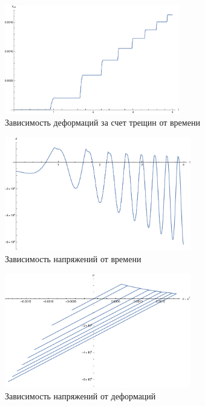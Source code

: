 \documentclass[12pt,a4paper]{article}
\begin{document}
\begin{enumerate}
    \begin{figure}[h]
      \centering
      \includegraphics[width=0.68\textwidth]{T2/h_1_tau_0.005/epsilon_crk(t).pdf}
      \caption{Зависимость деформаций за счет трещин от времени}
    \end{figure}

    \pagebreak

    \begin{figure}[h]
      \centering
      \includegraphics[width=0.725\textwidth]{T2/h_1_tau_0.005/sigma(t).pdf}
      \caption{Зависимость напряжений от времени}
    \end{figure}

    \begin{figure}[h]
      \centering
      \includegraphics[width=0.725\textwidth]{T2/h_1_tau_0.005/sigma(epsilon).pdf}
      \caption{Зависимость напряжений от деформаций}
    \end{figure}


\end{enumerate}
\end{document}
